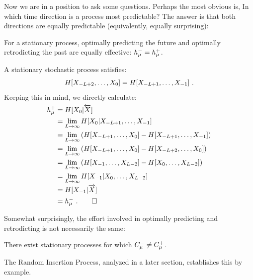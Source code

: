 Now we are in a position to ask some questions. Perhaps the most obvious is,
In which time direction is a process most predictable? The answer is that both directions are equally predictable (equivalently, equally surprising):
\begin{Prop}
\cite{Crut98d}
For a stationary process, optimally predicting the future
and optimally retrodicting the past are equally effective:
$h_\mu^{-} = h_\mu^{+}$.
\label{prop:FuturePastEqPredict}
\end{Prop}

\begin{ProProp}
A stationary stochastic process satisfies:
\begin{equation}
H[X_{-L+2},\ldots,{X}_0] = H[X_{-L+1},\ldots,{X}_{-1}] ~.
\end{equation}
Keeping this in mind, we directly calculate:
\begin{align*}
h_\mu^{+} & = H[{X}_0|\smash{\overleftarrow {{X}}}] \\
  & = \lim_{L \rightarrow \infty}
  	H[{X}_0|{X}_{-L+1},\ldots,{X}_{-1}] \\
  & = \lim_{L \rightarrow \infty}
    \left( H[{X}_{-L+1},\ldots,{X}_0]
		- H[{X}_{-L+1},\ldots,{X}_{-1}] \right) \\
  & = \lim_{L \rightarrow \infty}
    \left( H[{X}_{-L+1},\ldots,{X}_0]
		- H[{X}_{-L+2},\ldots,{X}_0] \right) \\
  & = \lim_{L \rightarrow \infty}
    \left( H[{X}_{-1},\ldots,{X}_{L-2}]
		- H[{X}_0,\ldots,{X}_{L-2}] \right) \\
  & = \lim_{L \rightarrow \infty}
  	H[{X}_{-1} | {X}_0,\ldots,{X}_{L-2}] \\
  & = H[{X}_{-1}|\smash{\overrightarrow{{X}}}] \\
  & = h_\mu^{-} ~. \qed 
\end{align*}
\end{ProProp}

Somewhat surprisingly, the effort involved in optimally predicting and
retrodicting is not necessarily the same:
\begin{Prop}
\cite{Crut91b}
There exist stationary processes for which $C_\mu^{-} \neq C_\mu^{+}$.
\label{ProcessNotTimeSymmetric}
\end{Prop}

\begin{ProProp}
The Random Insertion Process, analyzed in a later section,
establishes this by example.
\end{ProProp}


